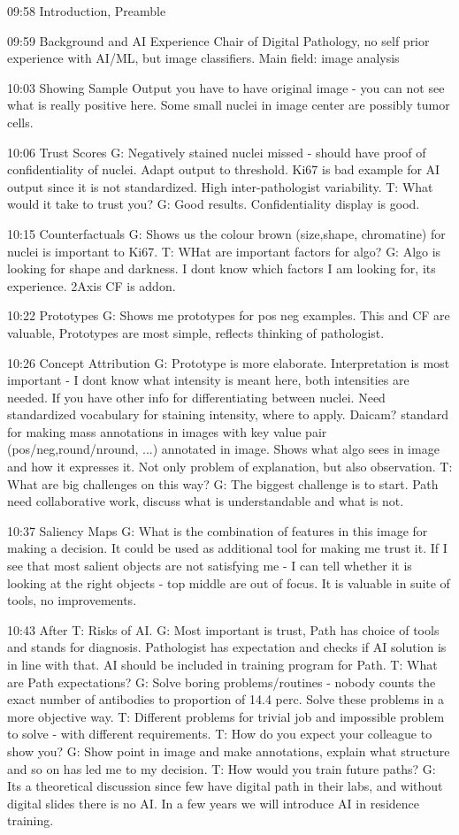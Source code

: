 09:58 Introduction, Preamble

09:59 Background and AI Experience
Chair of Digital Pathology, no self prior experience with AI/ML, but image classifiers. Main field: image analysis

10:03 Showing Sample Output
you have to have original image - you can not see what is really positive here. Some small nuclei in image center are possibly tumor cells. 

10:06 Trust Scores
G: Negatively stained nuclei missed - should have proof of confidentiality of nuclei. Adapt output to threshold. Ki67 is bad example for AI output since it is not standardized. High inter-pathologist variability. T: What would it take to trust you? G: Good results. Confidentiality display is good.

10:15 Counterfactuals
G: Shows us the colour brown (size,shape, chromatine) for nuclei is important to Ki67. T: WHat are important factors for algo? G: Algo is looking for shape and darkness. I dont know which factors I am looking for, its experience. 2Axis CF is addon.

10:22 Prototypes
G: Shows me prototypes for pos neg examples. This and CF are valuable, Prototypes are most simple, reflects thinking of pathologist.

10:26 Concept Attribution
G: Prototype is more elaborate. Interpretation is most important - I dont know what intensity is meant here, both intensities are needed. If you have other info for differentiating between nuclei.
Need standardized vocabulary for staining intensity, where to apply. 
Daicam? standard for making mass annotations in images with key value pair (pos/neg,round/nround, ...) annotated in image. Shows what algo sees in image and how it expresses it. Not only problem of explanation, but also observation.
T: What are big challenges on this way? G: The biggest challenge is to start. Path need collaborative work, discuss what is understandable and what is not.

10:37 Saliency Maps
G: What is the combination of features in this image for making a decision. It could be used as additional tool for making me trust it. If I see that most salient objects are not satisfying me - I can tell whether it is looking at the right objects - top middle are out of focus. It is valuable in suite of tools, no improvements.

10:43 After
T: Risks of AI. G: Most important is trust, Path has choice of tools and stands for diagnosis. Pathologist has expectation and checks if AI solution is in line with that. AI should be included in training program for Path. T: What are Path expectations? G: Solve boring problems/routines - nobody counts the exact number of antibodies to proportion of 14.4 perc. Solve these problems in a more objective way. T: Different problems for trivial job and impossible problem to solve - with different requirements. T: How do you expect your colleague to show you? G: Show point in image and make annotations, explain what structure and so on has led me to my decision.
T: How would you train future paths? G: Its a theoretical discussion since few have digital path in their labs, and without digital slides there is no AI. In a few years we will introduce AI in residence training.

